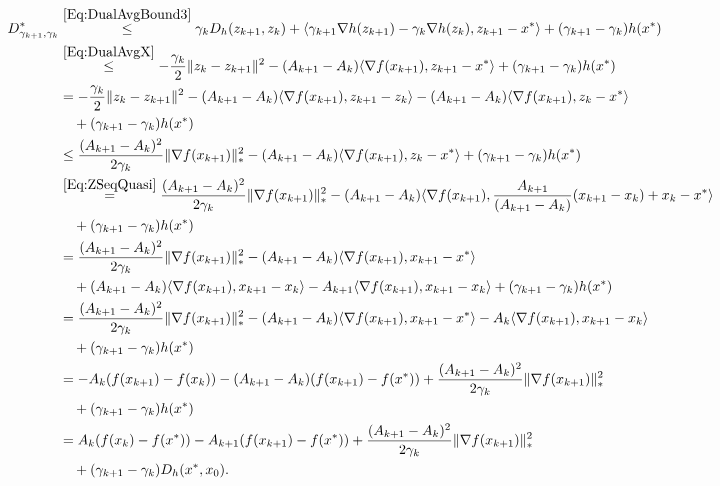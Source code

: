 \documentclass[11pt]{article}
\theoremstyle{plain}
\begin{document}
\begin{subequations}
\begin{align}
D^\ast_{\gamma_{k+1}, \gamma_k}& \overset{\eqref{Eq:DualAvgBound3}}{\leq} \gamma_{k} D_h(z_{k+1}, z_k) + \langle \gamma_{k+1} \nabla h(z_{k+1}) - \gamma_k \nabla h(z_k), z_{k+1} - x^\ast\rangle +  (\gamma_{k+1} - \gamma_{k})h(x^\ast) \notag\\ 
&\overset{\eqref{Eq:DualAvgX}}{\leq} -\frac{\gamma_{k}}{2}\|z_k - z_{k+1}\|^2 - (A_{k+1} - A_k) \langle \nabla f(x_{k+1}), z_{k+1} - x^\ast\rangle + (\gamma_{k+1} - \gamma_{k})h(x^\ast)  \notag\\
&= -\frac{\gamma_{k}}{2}\|z_k - z_{k+1}\|^2 - (A_{k+1} - A_k) \langle \nabla f(x_{k+1}), z_{k+1} - z_k\rangle - (A_{k+1} - A_k)\langle \nabla f(x_{k+1}), z_k - x^\ast\rangle\notag\\
&\quad   +(\gamma_{k+1} - \gamma_{k})h(x^\ast) \notag \\
&\leq\frac{(A_{k+1} - A_k)^2}{2\gamma_{k}} \|\nabla f(x_{k+1})\|_\ast^2 - (A_{k+1} - A_k) \langle \nabla f(x_{k+1}), z_k - x^\ast\rangle + (\gamma_{k+1} - \gamma_{k})h(x^\ast)  \notag\\
& \overset{\eqref{Eq:ZSeqQuasi}}{=}\frac{(A_{k+1} - A_k)^2}{2\gamma_{k}} \|\nabla f(x_{k+1})\|_\ast^2- (A_{k+1} - A_k)\langle \nabla f(x_{k+1}), \frac{A_{k+1}}{(A_{k+1} - A_k)}(x_{k+1} - x_k) + x_k - x^\ast\rangle\notag\\
&\quad +(\gamma_{k+1} - \gamma_{k})h(x^\ast)  \notag \\
& =\frac{(A_{k+1} - A_k)^2}{2\gamma_{k}} \|\nabla f(x_{k+1})\|_\ast^2 - (A_{k+1} - A_k)\langle \nabla f(x_{k+1}), x_{k+1} - x^\ast\rangle \notag \\
&\quad + (A_{k+1} - A_k)\langle \nabla f(x_{k+1}), x_{k+1} - x_k \rangle- A_{k+1} \langle \nabla f(x_{k+1}), x_{k+1} - x_k\rangle  +(\gamma_{k+1} - \gamma_{k})h(x^\ast)  \notag\\
& = \frac{(A_{k+1} - A_k)^2}{2\gamma_{k}} \|\nabla f(x_{k+1})\|_\ast^2  - (A_{k+1} - A_k)\langle \nabla f(x_{k+1}), x_{k+1} - x^\ast\rangle - A_{k} \langle \nabla f(x_{k+1}), x_{k+1} - x_k\rangle\notag \\
&\quad + (\gamma_{k+1} - \gamma_{k})h(x^\ast)  \notag \\
& = -A_k(f(x_{k+1}) - f(x_k)) - (A_{k+1} - A_k)(f(x_{k+1}) - f(x^\ast)) + \frac{(A_{k+1} - A_k)^2}{2\gamma_{k}} \|\nabla f(x_{k+1})\|_\ast^2\notag\\
&\quad + (\gamma_{k+1} - \gamma_{k})h(x^\ast)\notag\\
& = A_k (f(x_k) - f(x^\ast)) - A_{k+1}(f(x_{k+1}) - f(x^\ast)) + \frac{(A_{k+1} - A_k)^2}{2\gamma_{k}} \|\nabla f(x_{k+1})\|_\ast^2\notag\\
&\quad+ (\gamma_{k+1} - \gamma_{k})D_h(x^\ast, x_0).\notag
\end{align}
\end{subequations}
\end{document}
